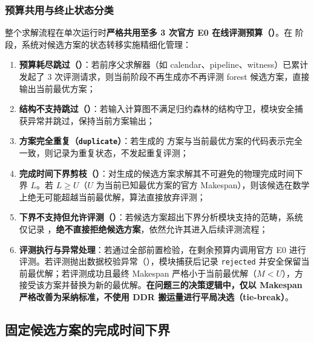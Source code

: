 \documentclass[anonymous,withtoc]{gmcm2026}
\providecommand{\tightlist}{\setlength{\itemsep}{0pt}\setlength{\parskip}{0pt}}
\begin{document}
\subsubsection{预算共用与终止状态分类}

整个求解流程在单次运行时\textbf{严格共用至多 3 次官方 E0 在线评测预算（\texttt{}）}。在 \texttt{} 阶段，系统对候选方案的状态转移实施精细化管理：

\begin{enumerate}
\def\labelenumi{\arabic{enumi}.}
\tightlist
\item
  \textbf{预算耗尽跳过（\texttt{}）}：若前序父求解器（如 calendar、pipeline、witness）已累计发起了 3 次评测请求，则当前阶段不再生成亦不再评测 forest 候选方案，直接输出当前最优方案；
\item
  \textbf{结构不支持跳过（\texttt{}）}：若输入计算图不满足归约森林的结构守卫，模块安全捕获异常并跳过，保持当前方案输出；
\item
  \textbf{方案完全重复（\texttt{duplicate}）}：若生成的 \texttt{} 方案与当前最优方案的代码表示完全一致，则记录为重复状态，不发起重复评测；
\item
  \textbf{完成时间下界剪枝（\texttt{}）}：对生成的候选方案求解其不可避免的物理完成时间下界 \(L\)。若 \(L \ge U\)（\(U\) 为当前已知最优方案的官方 Makespan），则该候选在数学上绝无可能超越当前最优解，算法直接放弃评测；
\item
  \textbf{下界不支持但允许评测（\texttt{}）}：若候选方案超出下界分析模块支持的范畴，系统仅记录 \texttt{}，\textbf{绝不直接拒绝候选方案}，依然允许其进入后续评测流程；
\item
  \textbf{评测执行与异常处理}：若通过全部前置检验，在剩余预算内调用官方 E0 进行评测。若评测抛出数据校验异常（\texttt{}），模块捕获后记录 \texttt{rejected} 并安全保留当前最优解；若评测成功且最终 Makespan 严格小于当前最优解（\(M < U\)），方接受该方案并替换为新的最优解。\textbf{在问题三的决策逻辑中，仅以 Makespan 严格改善为采纳标准，不使用 DDR 搬运量进行平局决选（tie-break）}。
\end{enumerate}

\subsection{固定候选方案的完成时间下界}
\end{document}
